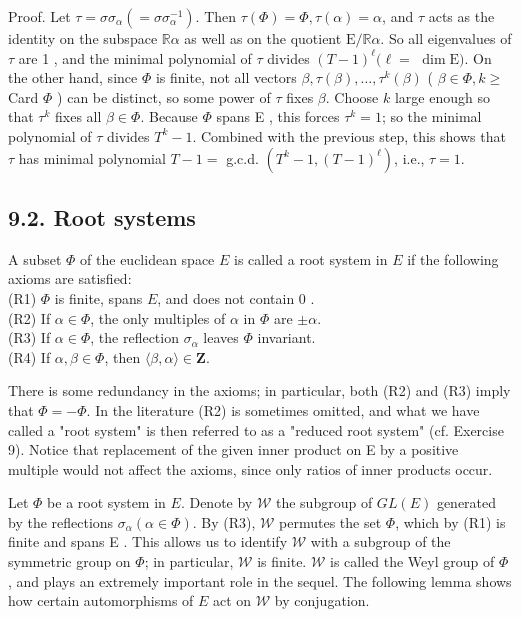 \documentclass[10pt]{article}
\begin{document}
Proof. Let $\tau=\sigma \sigma_{\alpha}\left(=\sigma \sigma_{\alpha}^{-1}\right)$. Then $\tau(\Phi)=\Phi, \tau(\alpha)=\alpha$, and $\tau$ acts as the identity on the subspace $\mathbb{R} \alpha$ as well as on the quotient $\mathrm{E} / \mathbb{R} \alpha$. So all eigenvalues of $\tau$ are 1 , and the minimal polynomial of $\tau$ divides $(T-1)^{\ell}(\ell=$ $\operatorname{dim} \mathrm{E})$. On the other hand, since $\Phi$ is finite, not all vectors $\beta, \tau(\beta), \ldots, \tau^{k}(\beta)$ ( $\beta \in \Phi, k \geq$ Card $\Phi$ ) can be distinct, so some power of $\tau$ fixes $\beta$. Choose $k$ large enough so that $\tau^{k}$ fixes all $\beta \in \Phi$. Because $\Phi$ spans E , this forces $\tau^{k}=1$; so the minimal polynomial of $\tau$ divides $T^{k}-1$. Combined with the previous step, this shows that $\tau$ has minimal polynomial $T-1=$ g.c.d. $\left(T^{k}-1,(T-1)^{\ell}\right)$, i.e., $\tau=1$.

\subsection*{9.2. Root systems}
A subset $\Phi$ of the euclidean space $E$ is called a root system in $E$ if the following axioms are satisfied:\\
(R1) $\Phi$ is finite, spans $E$, and does not contain 0 .\\
(R2) If $\alpha \in \Phi$, the only multiples of $\alpha$ in $\Phi$ are $\pm \alpha$.\\
(R3) If $\alpha \in \Phi$, the reflection $\sigma_{\alpha}$ leaves $\Phi$ invariant.\\
(R4) If $\alpha, \beta \in \Phi$, then $\langle\beta, \alpha\rangle \in \mathbf{Z}$.

There is some redundancy in the axioms; in particular, both (R2) and (R3) imply that $\Phi=-\Phi$. In the literature (R2) is sometimes omitted, and what we have called a "root system" is then referred to as a "reduced root system" (cf. Exercise 9). Notice that replacement of the given inner product on E by a positive multiple would not affect the axioms, since only ratios of inner products occur.

Let $\Phi$ be a root system in $E$. Denote by $\mathscr{W}$ the subgroup of $G L(E)$ generated by the reflections $\sigma_{\alpha}(\alpha \in \Phi)$. By (R3), $\mathscr{W}$ permutes the set $\Phi$, which by (R1) is finite and spans E . This allows us to identify $\mathscr{W}$ with a subgroup of the symmetric group on $\Phi$; in particular, $\mathscr{W}$ is finite. $\mathscr{W}$ is called the Weyl group of $\Phi$, and plays an extremely important role in the sequel. The following lemma shows how certain automorphisms of $E$ act on $\mathscr{W}$ by conjugation.
\end{document}
